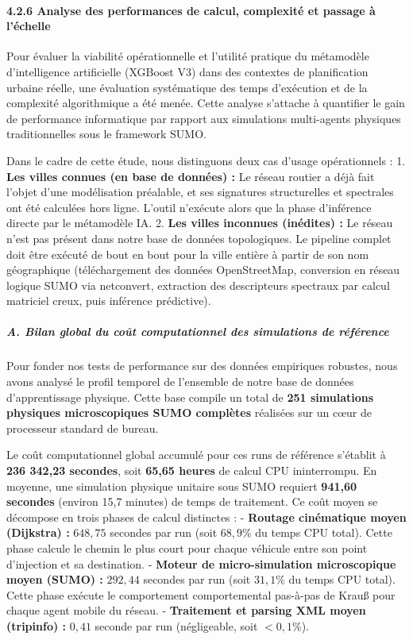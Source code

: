 \documentclass[10pt, a4paper]{article}
\begin{document}
\paragraph{4.2.6 Analyse des performances de calcul, complexité et
passage à
l'échelle}\label{analyse-des-performances-de-calcul-complexituxe9-et-passage-uxe0-luxe9chelle}

Pour évaluer la viabilité opérationnelle et l'utilité pratique du
métamodèle d'intelligence artificielle (XGBoost V3) dans des contextes
de planification urbaine réelle, une évaluation systématique des temps
d'exécution et de la complexité algorithmique a été menée. Cette analyse
s'attache à quantifier le gain de performance informatique par rapport
aux simulations multi-agents physiques traditionnelles sous le framework
SUMO.

Dans le cadre de cette étude, nous distinguons deux cas d'usage
opérationnels : 1. \textbf{Les villes connues (en base de données) :} Le
réseau routier a déjà fait l'objet d'une modélisation préalable, et ses
signatures structurelles et spectrales ont été calculées hors ligne.
L'outil n'exécute alors que la phase d'inférence directe par le
métamodèle IA. 2. \textbf{Les villes inconnues (inédites) :} Le réseau
n'est pas présent dans notre base de données topologiques. Le pipeline
complet doit être exécuté de bout en bout pour la ville entière à partir
de son nom géographique (téléchargement des données OpenStreetMap,
conversion en réseau logique SUMO via netconvert, extraction des
descripteurs spectraux par calcul matriciel creux, puis inférence
prédictive).

\subparagraph{A. Bilan global du coût computationnel des simulations de
référence}\label{a.-bilan-global-du-couxfbt-computationnel-des-simulations-de-ruxe9fuxe9rence}

Pour fonder nos tests de performance sur des données empiriques
robustes, nous avons analysé le profil temporel de l'ensemble de notre
base de données d'apprentissage physique. Cette base compile un total de
\textbf{251 simulations physiques microscopiques SUMO complètes}
réalisées sur un cœur de processeur standard de bureau.

Le coût computationnel global accumulé pour ces runs de référence
s'établit à \textbf{236 342,23 secondes}, soit \textbf{65,65 heures} de
calcul CPU ininterrompu. En moyenne, une simulation physique unitaire
sous SUMO requiert \textbf{941,60 secondes} (environ 15,7 minutes) de
temps de traitement. Ce coût moyen se décompose en trois phases de
calcul distinctes : - \textbf{Routage cinématique moyen (Dijkstra) :}
\(648,75\) secondes par run (soit \(68,9\%\) du temps CPU total). Cette
phase calcule le chemin le plus court pour chaque véhicule entre son
point d'injection et sa destination. - \textbf{Moteur de
micro-simulation microscopique moyen (SUMO) :} \(292,44\) secondes par
run (soit \(31,1\%\) du temps CPU total). Cette phase exécute le
comportement comportemental pas-à-pas de Krauß pour chaque agent mobile
du réseau. - \textbf{Traitement et parsing XML moyen (tripinfo) :}
\(0,41\) seconde par run (négligeable, soit \(<0,1\%\)).
\end{document}
